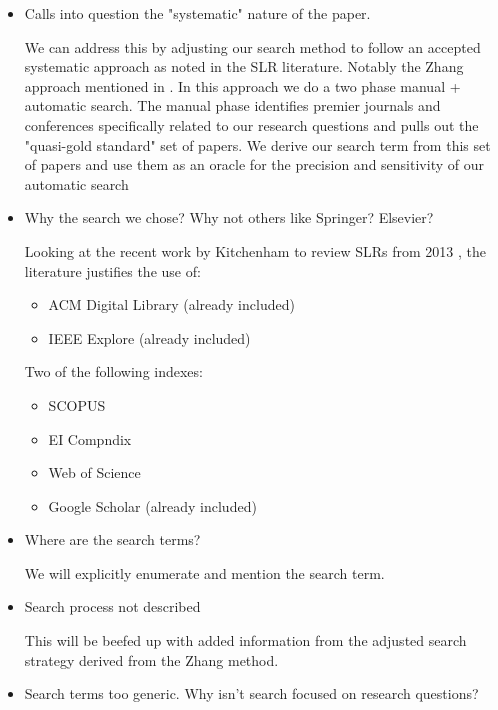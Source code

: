 \begin{itemize}

\item Calls into question the "systematic" nature of the paper.

We can address this by adjusting our search method to follow an accepted systematic approach as noted in the SLR literature. Notably the Zhang \cite{zhang2011identifying} approach mentioned in \cite{kitchenham2013systematic}. 
In this approach we do a two phase manual + automatic search. 
The manual phase identifies premier journals and conferences specifically related to our research questions and pulls out the "quasi-gold standard" set of papers.
We derive our search term from this set of papers and use them as an oracle for the precision and sensitivity of our automatic search

\item Why the search we chose? Why not others like Springer? Elsevier?

Looking at the recent work by Kitchenham to review SLRs from 2013 \cite{kitchenham2013systematic}, the literature justifies the use of: 

  \begin{itemize}
    \item ACM Digital Library (already included)
    \item IEEE Explore (already included)
  \end{itemize}

Two of the following indexes:
  \begin{itemize}
    \item SCOPUS
    \item EI Compndix
    \item Web of Science
    \item Google Scholar (already included)
  \end{itemize}

\item Where are the search terms?

We will explicitly enumerate and mention the search term.

\item Search process not described

This will be beefed up with added information from the adjusted search strategy derived from the Zhang method.

\item Search terms too generic. Why isn't search focused on research questions?


\end{itemize}
